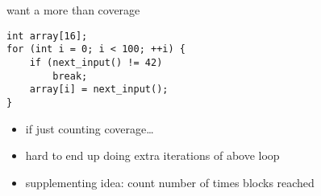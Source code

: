 \begin{frame}[fragile]{want a more than coverage}
\begin{lstlisting}[style=smaller]
int array[16];
for (int i = 0; i < 100; ++i) {
    if (next_input() != 42)
        break;
    array[i] = next_input();
}
\end{lstlisting}
\begin{itemize}
\item if just counting coverage\ldots
\item hard to end up doing extra iterations of above loop
\item supplementing idea: count number of times blocks reached
\end{itemize}
\end{frame}
